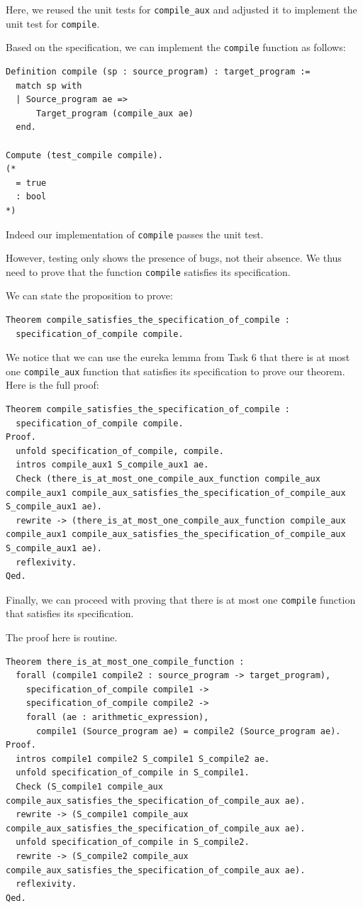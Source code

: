 \documentclass{article}
\begin{document}
Here, we reused the unit tests for \texttt{compile\_aux} and adjusted it to implement the unit test for \texttt{compile}.

Based on the specification, we can implement the \texttt{compile} function as follows:

\begin{lstlisting}
Definition compile (sp : source_program) : target_program :=
  match sp with
  | Source_program ae =>
      Target_program (compile_aux ae)
  end.

Compute (test_compile compile).
(*
  = true
  : bool
*)
\end{lstlisting}

Indeed our implementation of \texttt{compile} passes the unit test.

However, testing only shows the presence of bugs, not their absence. We thus need to prove that the function \texttt{compile} satisfies its specification.

We can state the proposition to prove:

\begin{lstlisting}
Theorem compile_satisfies_the_specification_of_compile :
  specification_of_compile compile.
\end{lstlisting}

We notice that we can use the eureka lemma from Task 6 that there is at most one \texttt{compile\_aux} function that satisfies its specification to prove our theorem. Here is the full proof:

\begin{lstlisting}
Theorem compile_satisfies_the_specification_of_compile :
  specification_of_compile compile.
Proof.
  unfold specification_of_compile, compile.
  intros compile_aux1 S_compile_aux1 ae.
  Check (there_is_at_most_one_compile_aux_function compile_aux compile_aux1 compile_aux_satisfies_the_specification_of_compile_aux S_compile_aux1 ae).
  rewrite -> (there_is_at_most_one_compile_aux_function compile_aux compile_aux1 compile_aux_satisfies_the_specification_of_compile_aux S_compile_aux1 ae).
  reflexivity.
Qed.
\end{lstlisting}

Finally, we can proceed with proving that there is at most one \texttt{compile} function that satisfies its specification.

The proof here is routine.

\begin{lstlisting}
Theorem there_is_at_most_one_compile_function :
  forall (compile1 compile2 : source_program -> target_program),
    specification_of_compile compile1 ->
    specification_of_compile compile2 ->
    forall (ae : arithmetic_expression),
      compile1 (Source_program ae) = compile2 (Source_program ae).
Proof.
  intros compile1 compile2 S_compile1 S_compile2 ae.
  unfold specification_of_compile in S_compile1.
  Check (S_compile1 compile_aux compile_aux_satisfies_the_specification_of_compile_aux ae).
  rewrite -> (S_compile1 compile_aux compile_aux_satisfies_the_specification_of_compile_aux ae).
  unfold specification_of_compile in S_compile2.
  rewrite -> (S_compile2 compile_aux compile_aux_satisfies_the_specification_of_compile_aux ae).
  reflexivity.
Qed.
\end{lstlisting}
\end{document}
